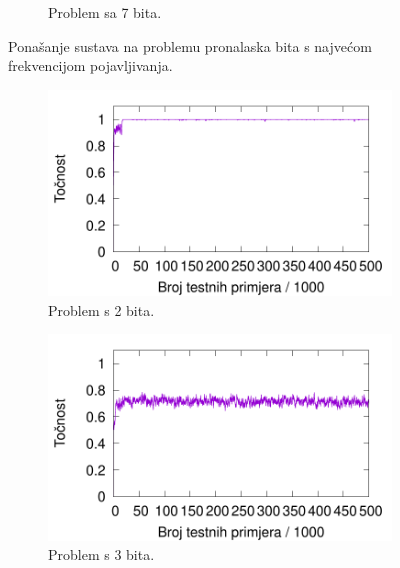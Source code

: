 \documentclass[times, utf8, zavrsni]{fer}
\begin{document}
\begin{figure}
\begin{subfigure}{0.496\textwidth}
        \caption{Problem sa 7 bita.}
        \label{fig:7majre}
    \end{subfigure}
    \caption{Ponašanje sustava na problemu pronalaska bita s najvećom frekvencijom pojavljivanja.}
    \label{fig:majre}
\end{figure}
\begin{figure}
    \centering
    \begin{subfigure}{0.496\textwidth}
        \centering
        \includegraphics[width=\textwidth]{img/parity/2pare.pdf}
        \caption{Problem s 2 bita.}
        \label{fig:2pare}
    \end{subfigure}
    \begin{subfigure}{0.496\textwidth}
        \centering
        \includegraphics[width=\textwidth]{img/parity/3pare.pdf}
        \caption{Problem s 3 bita.}
        \label{fig:3pare}
    \end{subfigure}
    \begin{subfigure}{0.496\textwidth}
        \centering

\end{subfigure}
\end{figure}
\end{document}
